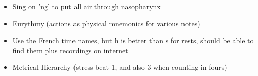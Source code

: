 \documentclass[10pt,a4paper]{memoir}
\begin{document}
\begin{itemize}
\item Sing on 'ng' to put all air through nasopharynx

\item Eurythmy (actions as physical mnemonics for various notes)

\item Use the French time names, but h is better than s for rests, should be able to find them plus recordings on internet

\item Metrical Hierarchy (stress beat 1, and also 3 when counting in fours)

\end{itemize}
\end{document}

